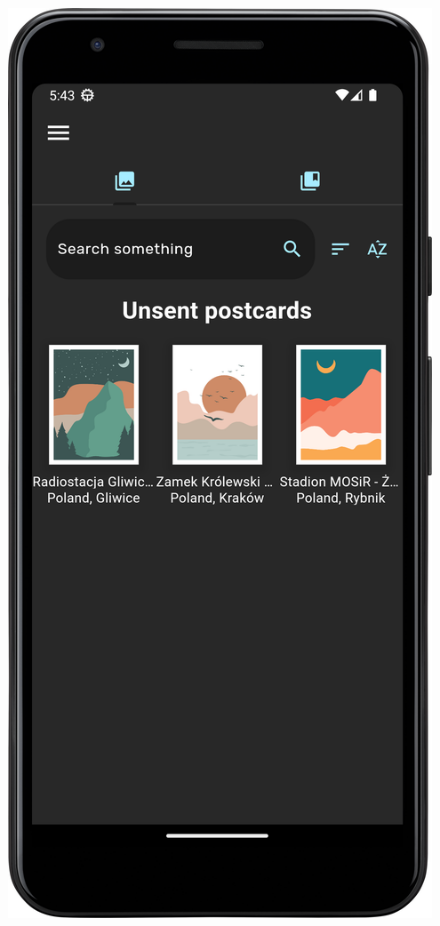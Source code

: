 \documentclass[a4paper,twoside,12pt]{book}
\begin{document}
\begin{figure}[H]
  \centering
  \begin{minipage}[b]{0.49\textwidth}
    \includegraphics[width=\textwidth]{mobile_ss/pocztowki.png}

\end{minipage}
\end{figure}
\end{document}
